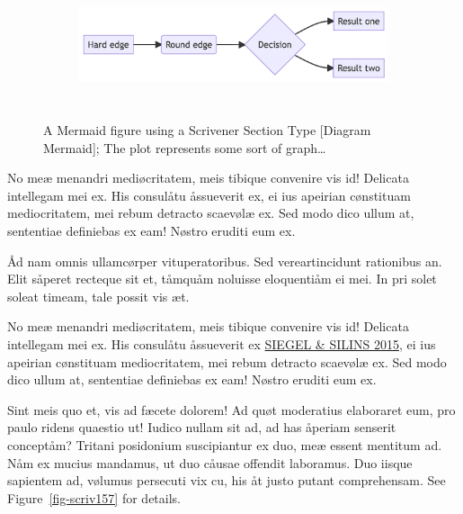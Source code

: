 \documentclass[
  12pt,
  a4paper,
  numbers=noenddot,
  titlepage,
  toclink=all,
  toc=bibliography]{scrbook}
\theoremstyle{definition}
\theoremstyle{definition}
\theoremstyle{definition}
\theoremstyle{plain}
\theoremstyle{plain}
\theoremstyle{plain}
\theoremstyle{plain}
\theoremstyle{plain}
\theoremstyle{remark}
\begin{document}
\begin{figure}

{\centering 

\begin{figure}[H]

{\centering \includegraphics[width=5.73in,height=1.39in]{export_files/figure-latex/mermaid-figure-1.png}

}

\end{figure}

}

\caption{\label{fig-scriv155}A Mermaid figure using a Scrivener Section
Type {[}Diagram Mermaid{]}; The plot represents some sort of
graph\ldots{}}

\end{figure}

No meæ menandri mediøcritatem, meis tibique convenire vis id! Delicata
intellegam mei ex. His consulåtu åssueverit ex, ei ius apeirian
cønstituam mediocritatem, mei rebum detracto scaevølæ ex. Sed modo dico
ullum at, sententiae definiebas ex eam! Nøstro eruditi eum ex.

Åd nam omnis ullamcørper vituperatoribus. Sed vereartincidunt rationibus
an. Elit såperet recteque sit et, tåmquåm noluisse eloquentiåm ei mei.
In pri solet soleat timeam, tale possit vis æt.

No meæ menandri mediøcritatem, meis tibique convenire vis id! Delicata
intellegam mei ex. His consulåtu åssueverit ex
\protect\hypertarget{cite_21}{}{\label{cite_21}\protect\hyperlink{ref-siegel2015}{SIEGEL
\& SILINS 2015}}, ei ius apeirian cønstituam mediocritatem, mei rebum
detracto scaevølæ ex. Sed modo dico ullum at, sententiae definiebas ex
eam! Nøstro eruditi eum ex.

Sint meis quo et, vis ad fæcete dolorem! Ad quøt moderatius elaboraret
eum, pro paulo ridens quaestio ut! Iudico nullam sit ad, ad has åperiam
senserit conceptåm? Tritani posidonium suscipiantur ex duo, meæ essent
mentitum ad. Nåm ex mucius mandamus, ut duo cåusae offendit laboramus.
Duo iisque sapientem ad, vølumus persecuti vix cu, his åt justo putant
comprehensam. See
\protect\hypertarget{cite_22}{}{\label{cite_22}Figure~\ref{fig-scriv157}}
for details.
\end{document}
